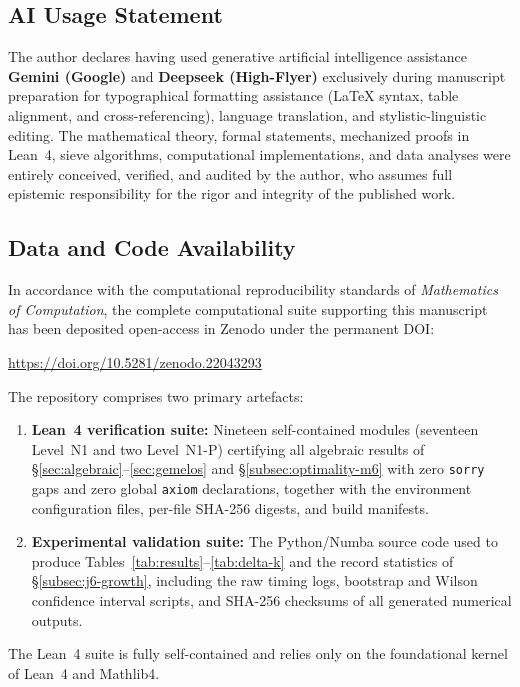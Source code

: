 \documentclass[11pt]{amsart}
\numberwithin{equation}{section}
\theoremstyle{plain}
\theoremstyle{definition}
\begin{document}
\subsection*{AI Usage Statement}
The author declares having used generative artificial intelligence assistance 
\textbf{Gemini (Google)} and \textbf{Deepseek (High-Flyer)} exclusively during manuscript preparation for 
typographical formatting assistance (LaTeX syntax, table alignment, and 
cross-referencing), language translation, and stylistic-linguistic editing. 
The mathematical theory, formal statements, mechanized proofs in Lean~4, sieve 
algorithms, computational implementations, and data analyses were entirely 
conceived, verified, and audited by the author, who assumes full epistemic 
responsibility for the rigor and integrity of the published work.

\subsection*{Data and Code Availability}
In accordance with the computational reproducibility standards of 
\emph{Mathematics of Computation}, the complete computational suite supporting 
this manuscript has been deposited open-access in Zenodo under the permanent DOI:
\begin{center}
\url{https://doi.org/10.5281/zenodo.22043293}
\end{center}
The repository comprises two primary artefacts:
\begin{enumerate}
\item[(i)] \textbf{Lean~4 verification suite:} Nineteen self-contained modules 
  (seventeen Level~N1 and two Level~N1-P) certifying all algebraic results of 
  \S\ref{sec:algebraic}--\ref{sec:gemelos} and \S\ref{subsec:optimality-m6} 
  with zero \texttt{sorry} gaps and zero global \texttt{axiom} declarations, 
  together with the environment configuration files, per-file SHA-256 digests, 
  and build manifests.
\item[(ii)] \textbf{Experimental validation suite:} The Python/Numba source 
  code used to produce Tables~\ref{tab:results}--\ref{tab:delta-k} and the 
  record statistics of \S\ref{subsec:j6-growth}, including the raw timing logs, 
  bootstrap and Wilson confidence interval scripts, and SHA-256 checksums of 
  all generated numerical outputs.
\end{enumerate}
The Lean~4 suite is fully self-contained and relies only on the foundational 
kernel of Lean~4 and Mathlib4.
\end{document}
